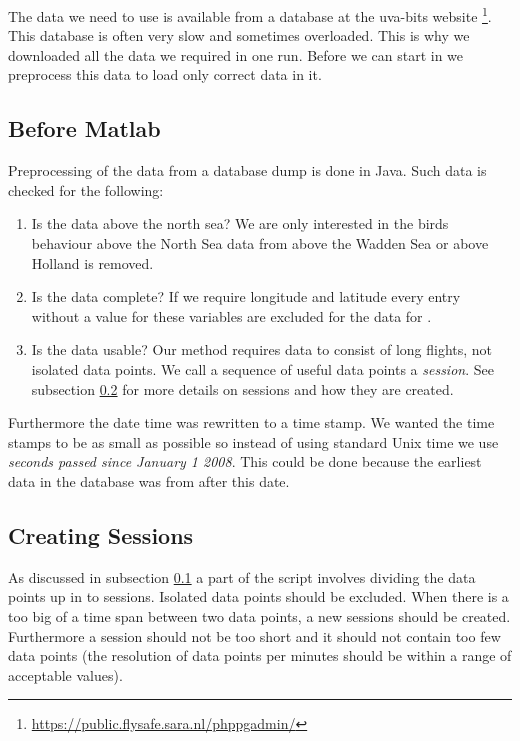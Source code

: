 The data we need to use is available from a database at the uva-bits website
\footnote{\url{https://public.flysafe.sara.nl/phppgadmin/} }. This database is often very slow 
and sometimes overloaded. This is why we downloaded all the data we required in one run. 
Before we can start in \matlab we preprocess this data to load only correct data
in it.

\subsection{Before Matlab}
\label{subsec:beforeMatlab}
Preprocessing of the data from a database dump is done in Java. Such data 
is checked for the following: 
\begin{enumerate}
    \item Is the data above the north sea? We are only interested in the birds behaviour 
    above the North Sea data from above the Wadden Sea or above Holland is removed.
    \item Is the data complete? If we require longitude and latitude every entry 
    without a value for these variables are excluded for the data for \matlab. 
    \item Is the data usable? Our method requires data to consist of long flights,
    not isolated data points. We call a sequence of useful data points a \textit{session}. 
    See subsection \ref{subsec:creatingSessions} for more details on sessions and how
    they are created.
\end{enumerate}

Furthermore the date time was rewritten to a time stamp. We wanted the time stamps to be 
as small as possible so instead of using standard Unix time we use \textit{seconds passed
since 
January 1 2008}. This could be done because the earliest data in the database was from after
this date. 

\subsection{Creating Sessions}
\label{subsec:creatingSessions}
As discussed in subsection \ref{subsec:beforeMatlab} a part of the script involves 
dividing the data points up in to sessions. Isolated data points should be excluded. 
When there is a too big of a time span between two data points, a new sessions should be 
created. Furthermore a session should not be too short and it should not contain too few
data points (the resolution of data points per minutes should be within a range of 
acceptable values). 

